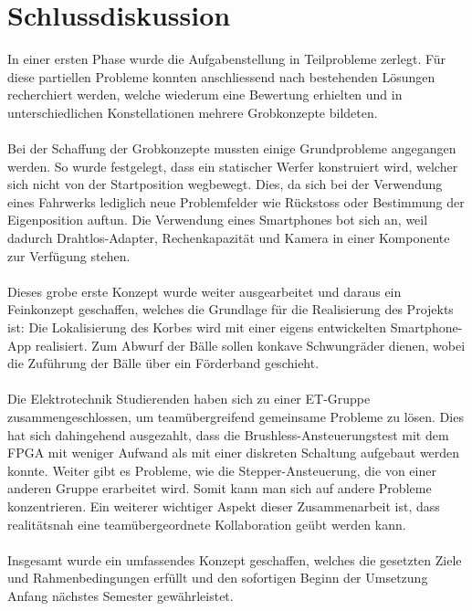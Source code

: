 \section{Schlussdiskussion}
In einer ersten Phase wurde die Aufgabenstellung in Teilprobleme zerlegt. Für diese partiellen 
Probleme konnten anschliessend nach bestehenden Lösungen recherchiert werden, welche wiederum 
eine Bewertung erhielten und in unterschiedlichen Konstellationen mehrere Grobkonzepte bildeten.\\
\\
Bei der Schaffung der Grobkonzepte mussten einige Grundprobleme angegangen werden. So wurde 
festgelegt, dass ein statischer Werfer konstruiert wird, welcher sich nicht von der Startposition 
wegbewegt. Dies, da sich bei der Verwendung eines Fahrwerks lediglich neue Problemfelder wie 
Rückstoss oder Bestimmung der Eigenposition auftun. Die Verwendung eines Smartphones bot sich 
an, weil dadurch Drahtlos-Adapter, Rechenkapazität und Kamera in einer Komponente zur Verfügung 
stehen. \\
\\
Dieses grobe erste Konzept wurde weiter ausgearbeitet und daraus ein Feinkonzept geschaffen, 
welches die Grundlage für die Realisierung des Projekts ist: Die Lokalisierung des Korbes wird 
mit einer eigens entwickelten Smartphone-App realisiert. Zum Abwurf der Bälle sollen konkave 
Schwungräder dienen, wobei die Zuführung der Bälle über ein Förderband 
geschieht. \\
\\
Die Elektrotechnik Studierenden haben sich zu einer ET-Gruppe zusammengeschlossen, um 
teamübergreifend gemeinsame Probleme zu lösen. Dies hat sich dahingehend ausgezahlt, dass 
die Brushless-Ansteuerungstest mit dem FPGA mit weniger Aufwand als mit einer diskreten Schaltung 
aufgebaut werden konnte. Weiter gibt es Probleme, wie die Stepper-Ansteuerung, die von einer anderen 
Gruppe erarbeitet wird. Somit kann man sich auf andere Probleme konzentrieren. Ein weiterer wichtiger 
Aspekt dieser Zusammenarbeit ist, dass realitätsnah eine teamübergeordnete Kollaboration geübt werden 
kann.\\
\\
Insgesamt wurde ein umfassendes Konzept geschaffen, welches die gesetzten Ziele und 
Rahmenbedingungen erfüllt und den sofortigen Beginn der Umsetzung Anfang nächstes Semester 
gewährleistet.